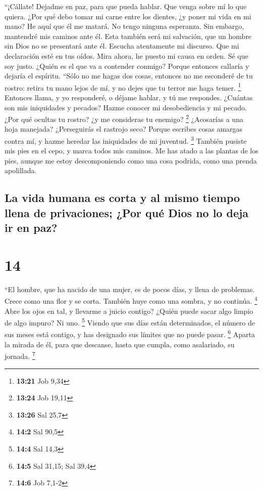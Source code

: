  ``¡Cállate! Dejadme en paz, para que pueda hablar. Que
venga sobre mí lo que quiera.  ¿Por qué debo tomar mi
carne entre los dientes, ¿y poner mi vida en mi mano?  He
aquí que él me matará. No tengo ninguna esperanza. Sin embargo,
mantendré mis caminos ante él.  Esta también será mi
salvación, que un hombre sin Dios no se presentará ante él.
 Escucha atentamente mi discurso. Que mi declaración esté
en tus oídos.  Mira ahora, he puesto mi causa en orden.
Sé que soy justo.  ¿Quién es el que va a contender
conmigo? Porque entonces callaría y dejaría el espíritu. 
``Sólo no me hagas dos cosas, entonces no me esconderé de tu rostro:
 retira tu mano lejos de mí, y no dejes que tu terror me
haga temer. \footnote{\textbf{13:21} Job 9,34}  Entonces
llama, y yo responderé, o déjame hablar, y tú me respondes.
 ¿Cuántas son mis iniquidades y pecados? Hazme conocer mi
desobediencia y mi pecado.  ¿Por qué ocultas tu rostro?
¿y me consideras tu enemigo? \footnote{\textbf{13:24} Job 19,11}
 ¿Acosarías a una hoja manejada? ¿Perseguirás el rastrojo
seco?  Porque escribes cosas amargas contra mí, y hazme
heredar las iniquidades de mi juventud. \footnote{\textbf{13:26} Sal
  25,7}  También pusiste mis pies en el cepo, y marca
todos mis caminos. Me has atado a las plantas de los pies,
 aunque me estoy descomponiendo como una cosa podrida,
como una prenda apolillada.

\hypertarget{la-vida-humana-es-corta-y-al-mismo-tiempo-llena-de-privaciones-por-quuxe9-dios-no-lo-deja-ir-en-paz}{%
\subsection{La vida humana es corta y al mismo tiempo llena de
privaciones; ¿Por qué Dios no lo deja ir en
paz?}\label{la-vida-humana-es-corta-y-al-mismo-tiempo-llena-de-privaciones-por-quuxe9-dios-no-lo-deja-ir-en-paz}}

\hypertarget{section-13}{%
\section{14}\label{section-13}}

 ``El hombre, que ha nacido de una mujer, es de pocos
días, y llena de problemas.  Crece como una flor y se
corta. También huye como una sombra, y no continúa. \footnote{\textbf{14:2}
  Sal 90,5}  Abre los ojos en tal, y llevarme a juicio
contigo?  ¿Quién puede sacar algo limpio de algo impuro?
Ni uno. \footnote{\textbf{14:4} Sal 14,3}  Viendo que sus
días están determinados, el número de sus meses está contigo, y has
designado sus límites que no puede pasar. \footnote{\textbf{14:5} Sal
  31,15; Sal 39,4}  Aparta la mirada de él, para que
descanse, hasta que cumpla, como asalariado, su jornada. \footnote{\textbf{14:6}
  Job 7,1-2}

